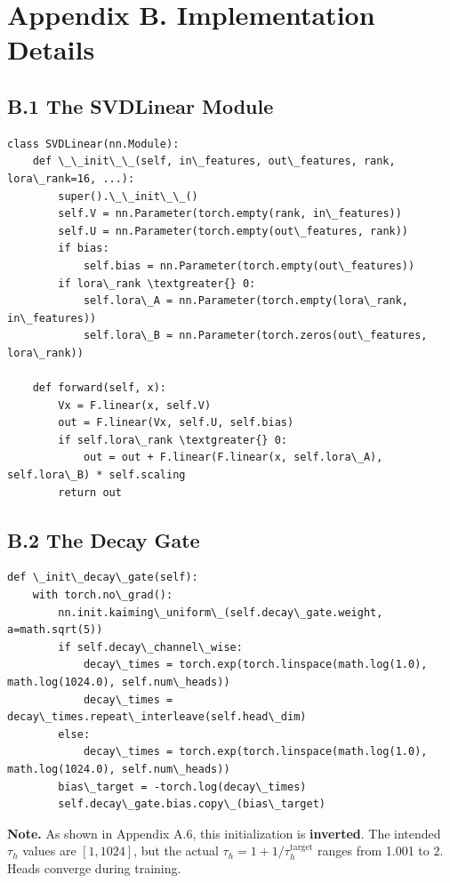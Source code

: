 
\section{Appendix B. Implementation Details}

\subsection{B.1 The SVDLinear Module}

\begin{lstlisting}
class SVDLinear(nn.Module):
    def \_\_init\_\_(self, in\_features, out\_features, rank, lora\_rank=16, ...):
        super().\_\_init\_\_()
        self.V = nn.Parameter(torch.empty(rank, in\_features))
        self.U = nn.Parameter(torch.empty(out\_features, rank))
        if bias:
            self.bias = nn.Parameter(torch.empty(out\_features))
        if lora\_rank \textgreater{} 0:
            self.lora\_A = nn.Parameter(torch.empty(lora\_rank, in\_features))
            self.lora\_B = nn.Parameter(torch.zeros(out\_features, lora\_rank))
    
    def forward(self, x):
        Vx = F.linear(x, self.V)
        out = F.linear(Vx, self.U, self.bias)
        if self.lora\_rank \textgreater{} 0:
            out = out + F.linear(F.linear(x, self.lora\_A), self.lora\_B) * self.scaling
        return out
\end{lstlisting}

\subsection{B.2 The Decay Gate}

\begin{lstlisting}
def \_init\_decay\_gate(self):
    with torch.no\_grad():
        nn.init.kaiming\_uniform\_(self.decay\_gate.weight, a=math.sqrt(5))
        if self.decay\_channel\_wise:
            decay\_times = torch.exp(torch.linspace(math.log(1.0), math.log(1024.0), self.num\_heads))
            decay\_times = decay\_times.repeat\_interleave(self.head\_dim)
        else:
            decay\_times = torch.exp(torch.linspace(math.log(1.0), math.log(1024.0), self.num\_heads))
        bias\_target = -torch.log(decay\_times)
        self.decay\_gate.bias.copy\_(bias\_target)
\end{lstlisting}

\textbf{Note.} As shown in Appendix A.6, this initialization is \textbf{inverted}. 
The intended $\tau_h$ values are $[1, 1024]$, but the actual $\tau_h = 1 + 1/\tau_h^\text{target}$ 
ranges from 1.001 to 2. Heads converge during training.

